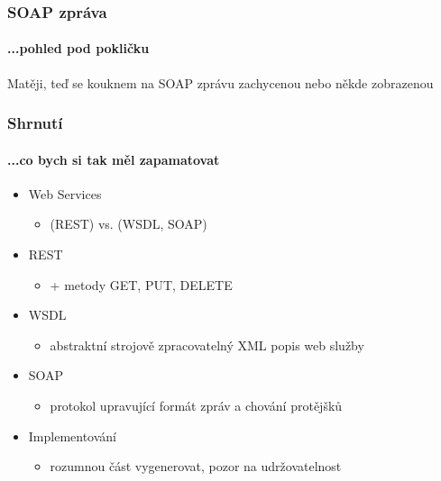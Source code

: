 \documentclass[12pt]{beamer}
\begin{document}
\begin{frame}
  \frametitle{SOAP zpráva}
  \framesubtitle{...pohled pod pokličku}

  \begin{example}
    Matěji, teď se kouknem na SOAP zprávu zachycenou nebo někde zobrazenou
  \end{example}
\end{frame}

\begin{frame}
  \frametitle{Shrnutí}
  \framesubtitle{...co bych si tak měl zapamatovat}

  \begin{itemize}
    \item Web Services
    \begin{itemize}
      \item {} (REST) vs.  (WSDL, SOAP)
    \end{itemize}

    \item REST
    \begin{itemize}
      \item {} + metody GET, PUT, DELETE
    \end{itemize}

    \item WSDL
    \begin{itemize}
      \item abstraktní strojově zpracovatelný XML popis web služby
    \end{itemize}

    \item SOAP
    \begin{itemize}
      \item protokol upravující formát zpráv a chování protějšků
    \end{itemize}

    \item Implementování
    \begin{itemize}
      \item rozumnou část vygenerovat, pozor na udržovatelnost
    \end{itemize}
  \end{itemize}
\end{frame}
\end{document}
